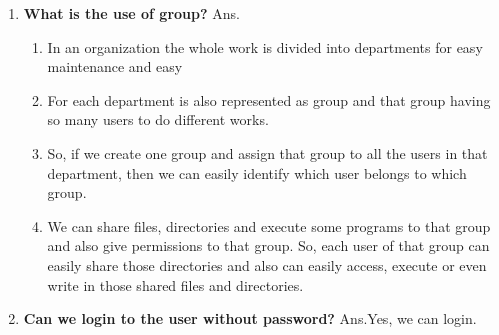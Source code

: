 \begin{enumerate}
    \item \textbf{What is the use of group?}
    \newline
    Ans.\begin{enumerate}
          \item In an organization the whole work is divided into departments for easy maintenance and easy 
          \item For each department is also represented as group and that group having so many users to do different works.
          \item So, if we create one group and assign that group to all the users in that department, then we can easily identify which user belongs to which group.
          \item We can share files, directories and execute some programs to that group and also give permissions to that 	group. So, each user of that group can easily share those directories and also can easily access, execute or even write in those shared files and directories.
        \end{enumerate}
    
    \bigskip
    \bigskip

    \item \textbf{Can we login to the user without password?}
    \newline
    Ans.Yes, we can login.

    \bigskip
    \bigskip


\end{enumerate}
